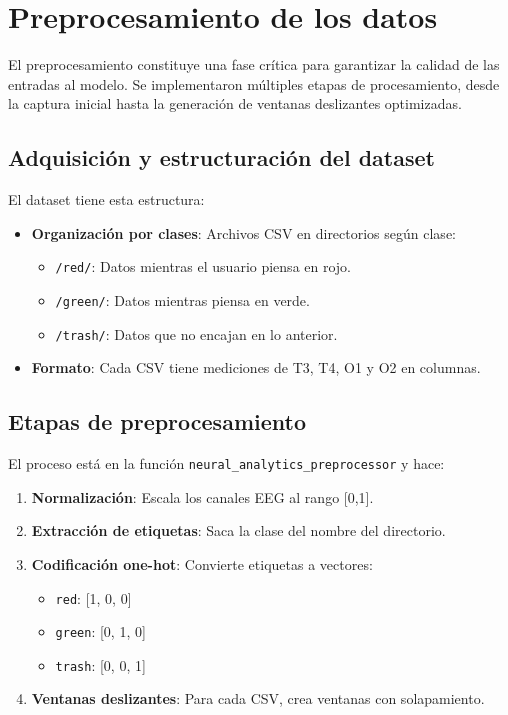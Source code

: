 \section{Preprocesamiento de los datos}

El preprocesamiento constituye una fase crítica para garantizar la calidad de las entradas al modelo. Se implementaron múltiples etapas de procesamiento, desde la captura inicial hasta la generación de ventanas deslizantes optimizadas.

\subsection{Adquisición y estructuración del dataset}

El dataset tiene esta estructura:

\begin{itemize}
    \item \textbf{Organización por clases}: Archivos CSV en directorios según clase:
    \begin{itemize}
        \item \texttt{/red/}: Datos mientras el usuario piensa en rojo.
        \item \texttt{/green/}: Datos mientras piensa en verde.
        \item \texttt{/trash/}: Datos que no encajan en lo anterior.
    \end{itemize}
    
    \item \textbf{Formato}: Cada CSV tiene mediciones de T3, T4, O1 y O2 en columnas.
\end{itemize}

\subsection{Etapas de preprocesamiento}

El proceso está en la función \texttt{neural\_analytics\_preprocessor} y hace:

\begin{enumerate}
    \item \textbf{Normalización}: Escala los canales EEG al rango [0,1].
    
    \item \textbf{Extracción de etiquetas}: Saca la clase del nombre del directorio.
    
    \item \textbf{Codificación one-hot}: Convierte etiquetas a vectores:
    \begin{itemize}
        \item \texttt{red}: [1, 0, 0]
        \item \texttt{green}: [0, 1, 0]
        \item \texttt{trash}: [0, 0, 1]
    \end{itemize}
    
    \item \textbf{Ventanas deslizantes}: Para cada CSV, crea ventanas con solapamiento.
\end{enumerate}

